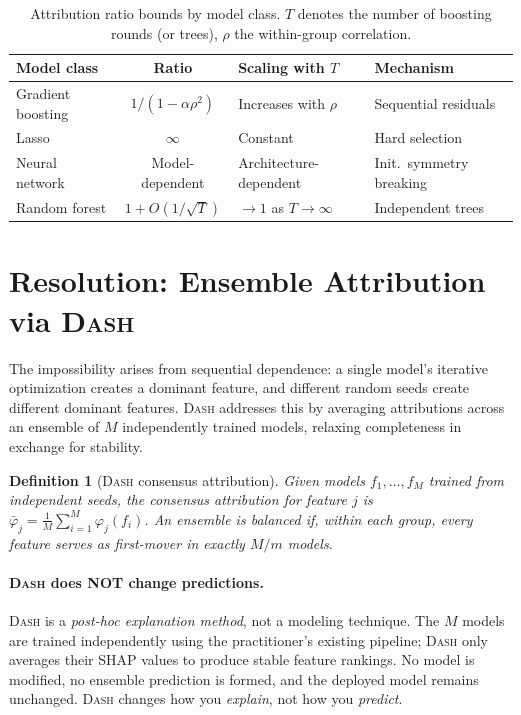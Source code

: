 \documentclass{article}
\newtheorem{definition}[theorem]{Definition}
\newcommand{\DASH}{\textsc{Dash}}
\begin{document}
\begin{table}[t]
\centering
\caption{Attribution ratio bounds by model class. $T$ denotes the number of boosting rounds (or trees), $\rho$ the within-group correlation.}
\label{tab:model-comparison}
\small
\begin{tabular}{@{}lcll@{}}
\toprule
Model class & Ratio & Scaling with $T$ & Mechanism \\
\midrule
Gradient boosting & $1/(1-\alpha\rho^2)$ & Increases with $\rho$ & Sequential residuals \\
Lasso & $\infty$ & Constant & Hard selection \\
Neural network & Model-dependent & Architecture-dependent & Init.\ symmetry breaking \\
Random forest\footnotemark & $1 + O(1/\sqrt{T})$ & $\to 1$ as $T \to \infty$ & Independent trees \\
\bottomrule
\end{tabular}
\end{table}


\section{Resolution: Ensemble Attribution via \DASH}
\label{sec:resolution}

The impossibility arises from sequential dependence: a single model's iterative optimization creates a dominant feature, and different random seeds create different dominant features.
\DASH{} addresses this by averaging attributions across an ensemble of $M$ independently trained models, relaxing completeness in exchange for stability.

\begin{definition}[\DASH{} consensus attribution]
\label{def:dash}
Given models $f_1, \ldots, f_M$ trained from independent seeds, the \emph{consensus attribution} for feature $j$ is $\bar{\varphi}_j = \frac{1}{M} \sum_{i=1}^{M} \varphi_j(f_i)$.
An ensemble is \emph{balanced} if, within each group, every feature serves as first-mover in exactly $M/m$ models.
\end{definition}

\paragraph{\DASH{} does NOT change predictions.}
\DASH{} is a \emph{post-hoc explanation method}, not a modeling technique. The $M$ models are trained independently using the practitioner's existing pipeline; \DASH{} only averages their SHAP values to produce stable feature rankings. No model is modified, no ensemble prediction is formed, and the deployed model remains unchanged. \DASH{} changes how you \emph{explain}, not how you \emph{predict}.
\end{document}
